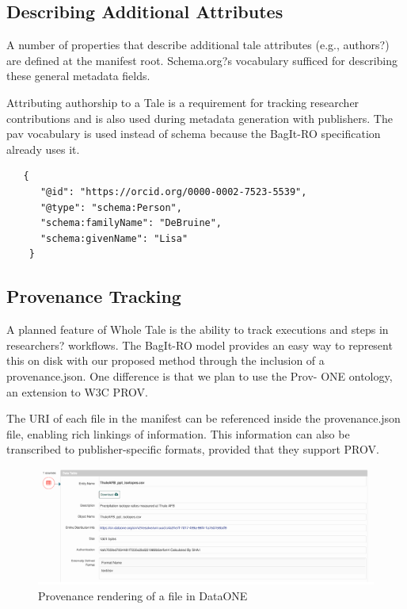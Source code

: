 \documentclass[conference]{IEEEtran}
\begin{document}
\subsection{Describing Additional Attributes}
A number of properties that describe additional tale attributes (e.g., authors?) are defined at 
the manifest root. Schema.org?s vocabulary sufficed for describing these general metadata fields.

Attributing authorship to a Tale is a requirement for tracking researcher contributions and is 
also used during metadata generation with publishers. The pav vocabulary is used instead of schema 
because the BagIt-RO specification already uses it.

\begin{lstlisting}
   {
      "@id": "https://orcid.org/0000-0002-7523-5539",
      "@type": "schema:Person",
      "schema:familyName": "DeBruine",
      "schema:givenName": "Lisa"
    }
\end{lstlisting}
		
		
\subsection{Provenance Tracking}

A planned feature of Whole Tale is the ability to track executions and steps in researchers? 
workflows. The BagIt-RO model provides an easy way to represent this on disk with our proposed 
method through the inclusion of a provenance.json. One difference is that we plan to use the Prov-
ONE ontology, an extension to W3C PROV.

The URI of each file in the manifest can be referenced inside the provenance.json file, enabling 
rich linkings of information. This information can also be transcribed to publisher-specific 
formats, provided that they support PROV.

\begin{figure}
\centering
\includegraphics[scale=0.25]{images/dataone-prov.png}
\caption{Provenance rendering of a file in DataONE}
\end{figure}
\end{document}
